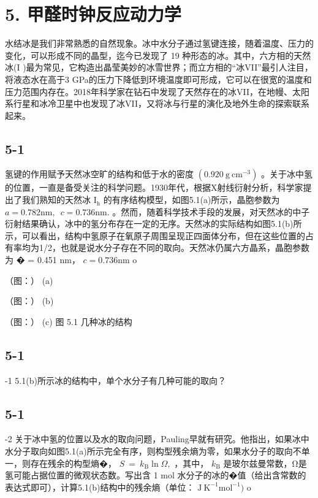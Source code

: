 \section*{5. 甲醛时钟反应动力学}
⽔结冰是我们⾮常熟悉的⾃然现象。冰中⽔分⼦通过氢键连接，随着温度、压⼒的变化，可以形成不同的晶型，迄今已发现了 19 种形态的冰。其中，六⽅相的天然冰(I )最为常⻅，它构造出晶莹美妙的冰雪世界；⽽⽴⽅相的“冰VII”最引⼈注⽬，将液态⽔在⾼于3 GPa的压⼒下降低到环境温度即可形成，它可以在很宽的温度和压⼒范围内存在。2018年科学家在钻⽯中发现了天然存在的冰VII，在地幔、太阳系⾏星和冰冷卫星中也发现了冰VII，⼜将冰与⾏星的演化及地外⽣命的探索联系起来。

\subsection*{5-1}
氢键的作⽤赋予天然冰空旷的结构和低于⽔的密度 $( 0 . 9 2 0 \ \mathrm { g \ c m ^ { - 3 } } )$ 。关于冰中氢的位置，⼀直是备受关注的科学问题。1930年代，根据X射线衍射分析，科学家提出了我们熟知的天然冰 $\mathrm { I _ { h } }$ 的有序结构模型，如图5.1(a)所⽰，晶胞参数为 $a = 0 . 7 8 2 \mathrm { n m } , \enspace c = 0 . 7 3 6 \mathrm { n m } .$ 。然⽽，随着科学技术⼿段的发展，对天然冰的中⼦衍射结果确认，冰中的氢分布存在⼀定的⽆序。天然冰的实际结构如图5.1(b)所⽰，可以看出，结构中氢原⼦在氧原⼦周围呈现正四⾯体分布，但在这些位置的占有率均为1/2，也就是说⽔分⼦存在不同的取向。天然冰仍属六⽅晶系，晶胞参数为 � = 0.451 nm， $c = 0 . 7 3 6 \mathrm { n m }$ o

（图：）
(a)

（图：）
(b)

（图：）
(c)
图 5.1 ⼏种冰的结构

\subsection*{5-1}
-1 5.1(b)所⽰冰的结构中，单个⽔分⼦有⼏种可能的取向？

\subsection*{5-1}
-2 关于冰中氢的位置以及⽔的取向问题，Pauling早就有研究。他指出，如果冰中⽔分⼦取向如图5.1(a)所⽰完全有序，则构型残余熵为零，如果⽔分⼦的取向不单⼀，则存在残余的构型熵�， $S \ = \ k _ { \mathrm { B } } \ln \Omega ,$ ，其中， $k _ { \mathrm { B } }$ 是玻尔兹曼常数，Ω是氢可能占据位置的微观状态数。写出含 1 mol ⽔分⼦的冰的�值（给出含常数的表达式即可），计算5.1(b)结构中的残余熵（单位： $\mathrm { J ~ K ^ { - 1 } m o l ^ { - 1 } } )$ o

